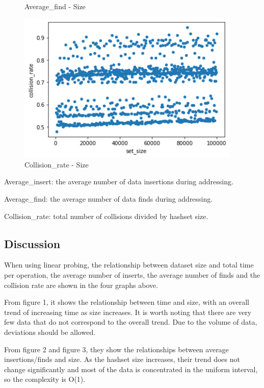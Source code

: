\documentclass[a4]{article}
\begin{document}
\begin{figure}[H]
\begin{minipage}{0.5\textwidth}
    \caption{Average\_find - Size}
    \end{minipage}
    \begin{minipage}{0.5\textwidth}        
    \includegraphics[width=0.95\textwidth]{hashset4.png}
    \caption{Collision\_rate - Size}
    \end{minipage}
\end{figure}
\noindent Average\_insert: the average number of data insertions during addressing.

\noindent Average\_find: the average number of data finds during addressing.

\noindent Collision\_rate: total number of collisions divided by hashset size.

\subsection{Discussion}
When using linear probing, the relationship between dataset size and total time per operation, the average number of inserts, the average number of finds and the collision rate are shown in the four graphs above.

From figure 1, it shows the relationship between time and size, with an overall trend of increasing time as size increases. It is worth noting that there are very few data that do not correspond to the overall trend. Due to the volume of data, deviations should be allowed.

From figure 2 and figure 3, they show the relationships between average insertions/finds and size. As the hashset size increases, their trend does not change significantly and most of the data is concentrated in the uniform interval, so the complexity is O(1).
\end{document}
